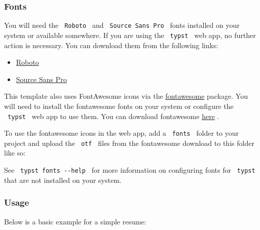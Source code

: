 \subsubsection{Fonts}\label{fonts}

You will need the \texttt{\ Roboto\ } and \texttt{\ Source\ Sans\ Pro\ }
fonts installed on your system or available somewhere. If you are using
the \texttt{\ typst\ } web app, no further action is necessary. You can
download them from the following links:

\begin{itemize}
\tightlist
\item
  \href{https://fonts.google.com/specimen/Roboto}{Roboto}
\item
  \href{https://github.com/adobe-fonts/source-sans-pro}{Source Sans Pro}
\end{itemize}

This template also uses FontAwesome icons via the
\href{https://typst.app/universe/package/fontawesome}{fontawesome}
package. You will need to install the fontawesome fonts on your system
or configure the \texttt{\ typst\ } web app to use them. You can
download fontawesome \href{https://fontawesome.com/download}{here} .

To use the fontawesome icons in the web app, add a \texttt{\ fonts\ }
folder to your project and upload the \texttt{\ otf\ } files from the
fontawesome download to this folder like so:


See \texttt{\ typst\ fonts\ -\/-help\ } for more information on
configuring fonts for \texttt{\ typst\ } that are not installed on your
system.

\subsubsection{Usage}\label{usage}

Below is a basic example for a simple resume:

